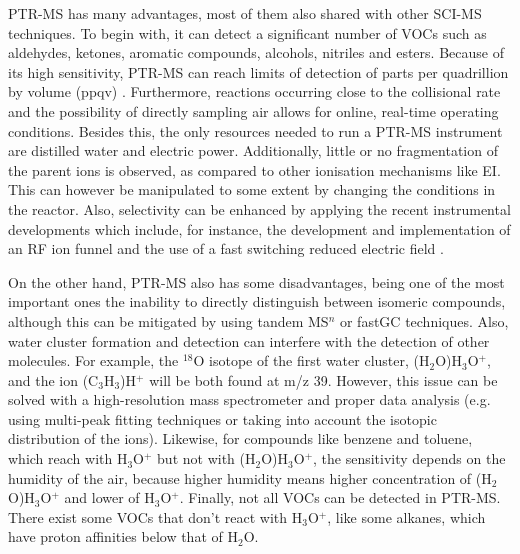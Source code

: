 PTR-MS has many advantages, most of them also shared with other SCI-MS techniques. To begin with, it can detect a significant number of  VOCs such as aldehydes, ketones, aromatic compounds, alcohols,  nitriles and esters.
Because of its high sensitivity, PTR-MS can reach limits of detection of parts per quadrillion by volume (\acrshort{ppqv}) \cite{ioniconlod}.
Furthermore, reactions occurring close to the collisional rate and the possibility of directly sampling air allows for online, real-time operating conditions. Besides this, the only resources needed to run a PTR-MS instrument are distilled water and electric power.
Additionally, little or no fragmentation of the parent ions is observed, as compared to other ionisation mechanisms like EI. This  can however be manipulated to some extent by changing the conditions in the reactor. Also, selectivity can be enhanced by applying the recent instrumental developments which include, for instance, the development and implementation of an RF ion funnel \cite{barber2012increased,RF_TNT} and the use of a fast switching reduced electric field \cite{doi:10.1021/acs.analchem.7b05211}.

On the other hand, PTR-MS also has some disadvantages, being one of the most important ones the inability to directly distinguish between isomeric compounds, although this can be mitigated by using tandem MS$^n$ or fastGC techniques. %
Also, water cluster formation and detection can interfere with the detection of other molecules. For example, the $^{18}$O isotope of the first water cluster, (H$_2$O)H$_3$O$^+$, and the ion (C$_3$H$_3$)H$^+$ will  be both found at m/z 39. However, this issue can be solved with a high-resolution mass spectrometer and proper data analysis (e.g. using multi-peak fitting techniques or taking into account the isotopic distribution of the ions). Likewise, for compounds like benzene and toluene, which reach with H$_3$O$^+$ but not with (H$_2$O)H$_3$O$^+$, the sensitivity depends on the humidity of the air, because higher humidity means higher concentration of (H$_2$O)H$_3$O$^+$ and lower of H$_3$O$^+$. Finally, not all VOCs can be detected in PTR-MS. There exist some VOCs that don’t react with H$_3$O$^+$, like some alkanes, which have proton affinities below that of H$_2$O.












